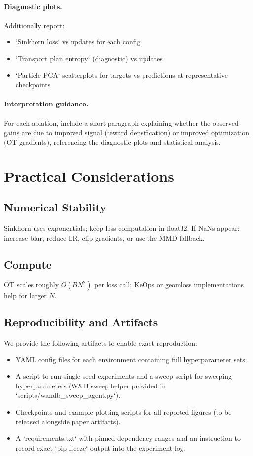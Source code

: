 \documentclass{article}
\begin{document}
\paragraph{Diagnostic plots.} Additionally report:
\begin{itemize}
  \item `Sinkhorn loss` vs updates for each config
  \item `Transport plan entropy` (diagnostic) vs updates
  \item `Particle PCA` scatterplots for targets vs predictions at representative checkpoints
\end{itemize}

\paragraph{Interpretation guidance.} For each ablation, include a short paragraph explaining whether the observed gains are due to improved signal (reward densification) or improved optimization (OT gradients), referencing the diagnostic plots and statistical analysis.

\section{Practical Considerations}
\subsection{Numerical Stability}
Sinkhorn uses exponentials; keep loss computation in float32. If NaNs appear: increase blur, reduce LR, clip gradients, or use the MMD fallback.
\subsection{Compute}
OT scales roughly $O(BN^2)$ per loss call; KeOps or geomloss implementations help for larger $N$.

\subsection{Reproducibility and Artifacts}
We provide the following artifacts to enable exact reproduction:
\begin{itemize}
  \item YAML config files for each environment containing full hyperparameter sets.
  \item A script to run single-seed experiments and a sweep script for sweeping hyperparameters (W\&B sweep helper provided in `scripts/wandb_sweep_agent.py`).
  \item Checkpoints and example plotting scripts for all reported figures (to be released alongside paper artifacts).
  \item A `requirements.txt` with pinned dependency ranges and an instruction to record exact `pip freeze` output into the experiment log.
\end{itemize}
\end{document}

